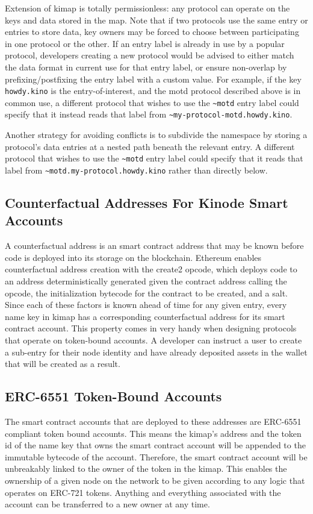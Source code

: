 \documentclass[runningheads]{llncs}
\begin{document}
Extension of kimap is totally permissionless: any protocol can operate on the keys and data stored in the map.
Note that if two protocols use the same entry or entries to store data, key owners may be forced to choose between participating in one protocol or the other.
If an entry label is already in use by a popular protocol, developers creating a new protocol would be advised to either match the data format in current use for that entry label, or ensure non-overlap by prefixing/postfixing the entry label with a custom value.
For example, if the key \verb|howdy.kino| is the entry-of-interest, and the motd protocol described above is in common use, a different protocol that wishes to use the \verb|~motd| entry label could specify that it instead reads that label from \verb|~my-protocol-motd.howdy.kino|.

Another strategy for avoiding conflicts is to subdivide the namespace by storing a protocol's data entries at a nested path beneath the relevant entry.
A different protocol that wishes to use the \verb|~motd| entry label could specify that it reads that label from \verb|~motd.my-protocol.howdy.kino| rather than directly below.

\subsection{Counterfactual Addresses For Kinode Smart Accounts}

A counterfactual address is an smart contract address that may be known before code is deployed into its storage on the blockchain.
Ethereum enables counterfactual address creation with the create2 opcode, which deploys code to an address deterministically generated given the contract address calling the opcode, the initialization bytecode for the contract to be created, and a salt.
Since each of these factors is known ahead of time for any given entry, every name key in kimap has a corresponding counterfactual address for its smart contract account.
This property comes in very handy when designing protocols that operate on token-bound accounts.
A developer can instruct a user to create a sub-entry for their node identity and have already deposited assets in the wallet that will be created as a result.

\subsection{ERC-6551 Token-Bound Accounts}

The smart contract accounts that are deployed to these addresses are ERC-6551 compliant token bound accounts.
This means the kimap's address and the token id of the name key that owns the smart contract account will be appended to the immutable bytecode of the account.
Therefore, the smart contract account will be unbreakably linked to the owner of the token in the kimap.
This enables the ownership of a given node on the network to be given according to any logic that operates on ERC-721 tokens.
Anything and everything associated with the account can be transferred to a new owner at any time.
\end{document}
